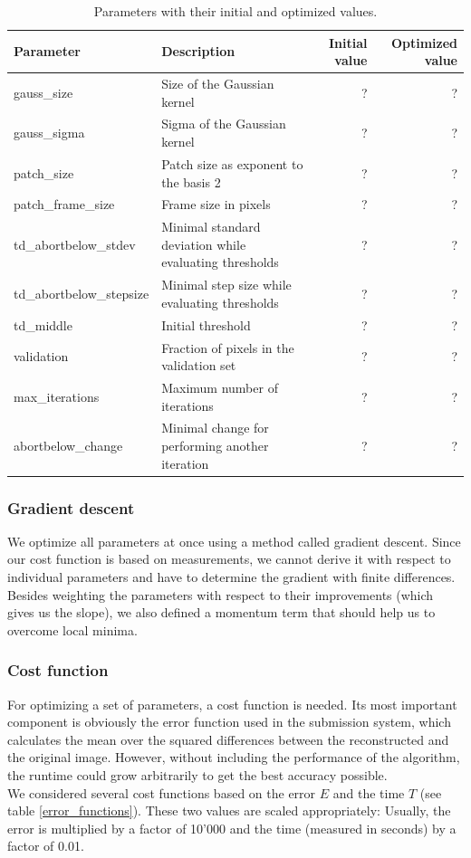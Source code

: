 \documentclass[10pt,conference,compsocconf]{IEEEtran}
\begin{document}
\begin{table}
\begin{center}
\begin{tabular}{|l|l|r|r|}
\hline
Parameter & Description & Initial value & Optimized value\\
\hline
gauss\_size & Size of the Gaussian kernel & ? & ? \\
gauss\_sigma & Sigma of the Gaussian kernel & ? & ? \\
patch\_size & Patch size as exponent to the basis 2 & ? & ? \\
patch\_frame\_size & Frame size in pixels & ? & ? \\
td\_abortbelow\_stdev & Minimal standard deviation while evaluating thresholds & ? & ? \\
td\_abortbelow\_stepsize & Minimal step size while evaluating thresholds & ? & ? \\
td\_middle & Initial threshold & ? & ? \\
validation & Fraction of pixels in the validation set & ? & ? \\
max\_iterations & Maximum number of iterations & ? & ? \\
abortbelow\_change & Minimal change for performing another iteration & ? & ? \\
\hline
\end{tabular}
\end{center}
\caption{Parameters with their initial and optimized values.}
\label{parameters}
\end{table}

\subsubsection{Gradient descent}
\label{gradient_descent}
We optimize all parameters at once using a method called gradient descent. Since our cost function is based on measurements, we cannot derive it with respect to individual parameters and have to determine the gradient with finite differences. Besides weighting the parameters with respect to their improvements (which gives us the slope), we also defined a momentum term that should help us to overcome local minima.

\subsubsection{Cost function}
For optimizing a set of parameters, a cost function is needed. Its most important component is obviously the error function used in the submission system, which calculates the mean over the squared differences between the reconstructed and the original image. However, without including the performance of the algorithm, the runtime could grow arbitrarily to get the best accuracy possible.\\
We considered several cost functions based on the error $E$ and the time $T$ (see table \ref{error_functions}). These two values are scaled appropriately: Usually, the error is multiplied by a factor of 10'000 and the time (measured in seconds) by a factor of 0.01.
\end{document}
